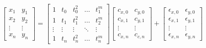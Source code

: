 \begin{equation}
    \begin{bmatrix}
        x_1 & y_1 \\ x_2 & y_2 \\ \vdots & \vdots \\ x_n & y_n
    \end{bmatrix}
    =
    \begin{bmatrix}
        1      & t_0     & t_0^2     & \ldots & t_1^m \\
        1      & t_1     & t_1^2     & \ldots & t_2^m \\
        \vdots & \vdots  & \vdots    & \ddots & \vdots \\
        1      & t_n     & t_n^2     & \ldots & t_n^m
    \end{bmatrix}
    \begin{bmatrix}
        c_{x,0} & c_{y,0} \\
        c_{x,1} & c_{y,1} \\
        \vdots  & \vdots \\
        c_{x,n} & c_{c,n}
    \end{bmatrix}
    +
    \begin{bmatrix}
        \epsilon_{x,0} & \epsilon_{y,0} \\
        \epsilon_{x,1} & \epsilon_{y,1} \\
        \vdots         & \vdots \\
        \epsilon_{x,n} & \epsilon_{y,n}
    \end{bmatrix}
\end{equation}

